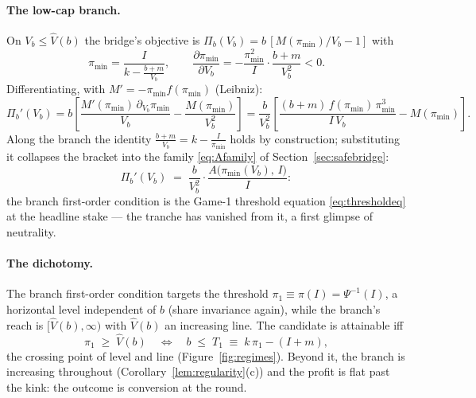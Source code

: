 \documentclass[11pt]{article}
\theoremstyle{definition}
\newcommand{\pimin}{\pi_{\min}}
\begin{document}
\paragraph{The low-cap branch.}
On $V_b\le\hat V(b)$ the bridge's objective is $\Pi_b(V_b)=b\,[M(\pimin)/V_b-1]$ with
\[
\pimin=\frac{I}{k-\frac{b+m}{V_b}},
\qquad
\frac{\partial\pimin}{\partial V_b}=-\frac{\pimin^{2}}{I}\cdot\frac{b+m}{V_b^{2}}<0 .
\]
Differentiating, with $M'=-\pimin f(\pimin)$ (Leibniz):
\[
\Pi_b'(V_b)
= b\left[\frac{M'(\pimin)\,\partial_{V_b}\pimin}{V_b}-\frac{M(\pimin)}{V_b^{2}}\right]
= \frac{b}{V_b^{2}}\left[\frac{(b+m)\,f(\pimin)\,\pimin^{3}}{I\,V_b}-M(\pimin)\right].
\]
Along the branch the identity $\tfrac{b+m}{V_b}=k-\tfrac{I}{\pimin}$ holds by construction; substituting it collapses the bracket into the family \eqref{eq:Afamily} of Section~\ref{sec:safebridge}:
\begin{equation}
\Pi_b'(V_b)\;=\;\frac{b}{V_b^{2}}\cdot\frac{A\bigl(\pimin(V_b),\,I\bigr)}{I}:
\label{eq:profitA}
\end{equation}
the branch first-order condition is the Game-1 threshold equation \eqref{eq:thresholdeq} at the headline stake --- the tranche has vanished from it, a first glimpse of neutrality.

\paragraph{The dichotomy.}
The branch first-order condition targets the threshold $\pi_1\equiv\pi(I)=\Psi^{-1}(I)$, a horizontal level independent of $b$ (share invariance again), while the branch's reach is $[\hat V(b),\infty)$ with $\hat V(b)$ an increasing line. The candidate is attainable iff
\[
\pi_1\;\ge\;\hat V(b)
\quad\Longleftrightarrow\quad
b\;\le\;T_1\;\equiv\;k\,\pi_1-(I+m),
\]
the crossing point of level and line (Figure~\ref{fig:regimes}). Beyond it, the branch is increasing throughout (Corollary~\ref{lem:regularity}(c)) and the profit is flat past the kink: the outcome is conversion at the round.
\end{document}

